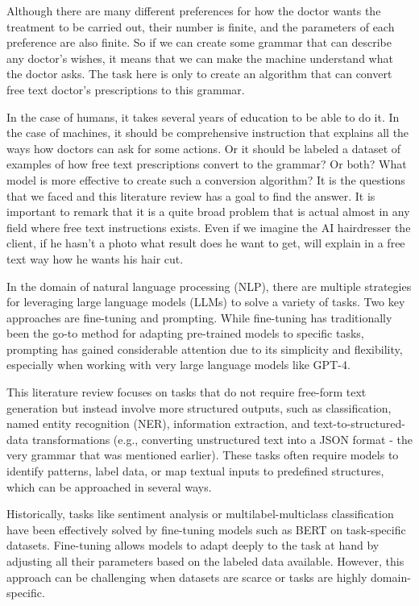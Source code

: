 \documentclass[11pt]{article}
\begin{document}
Although there are many different preferences for how the doctor wants the treatment to be carried out, their number is finite, and the parameters of each preference are also finite. So if we can create some grammar that can describe any doctor's wishes, it means that we can make the machine understand what the doctor asks. The task here is only to create an algorithm that can convert free text doctor's prescriptions to this grammar. 

In the case of humans, it takes several years of education to be able to do it. In the case of machines, it should be comprehensive instruction that explains all the ways how doctors can ask for some actions. Or it should be labeled a dataset of examples of how free text prescriptions convert to the grammar? Or both? What model is more effective to create such a conversion algorithm? It is the questions that we faced and this literature review has a goal to find the answer. It is important to remark that it is a quite broad problem that is actual almost in any field where free text instructions exists. Even if we imagine the AI hairdresser the client, if he hasn't a photo what result does he want to get, will explain in a free text way how he wants his hair cut.

In the domain of natural language processing (NLP), there are multiple strategies for leveraging large language models (LLMs) to solve a variety of tasks. Two key approaches are fine-tuning and prompting. While fine-tuning has traditionally been the go-to method for adapting pre-trained models to specific tasks, prompting has gained considerable attention due to its simplicity and flexibility, especially when working with very large language models like GPT-4.

This literature review focuses on tasks that do not require free-form text generation but instead involve more structured outputs, such as classification, named entity recognition (NER), information extraction, and text-to-structured-data transformations (e.g., converting unstructured text into a JSON format - the very grammar that was mentioned earlier). These tasks often require models to identify patterns, label data, or map textual inputs to predefined structures, which can be approached in several ways.

Historically, tasks like sentiment analysis or multilabel-multiclass classification have been effectively solved by fine-tuning models such as BERT on task-specific datasets. Fine-tuning allows models to adapt deeply to the task at hand by adjusting all their parameters based on the labeled data available. However, this approach can be challenging when datasets are scarce or tasks are highly domain-specific.
\end{document}
